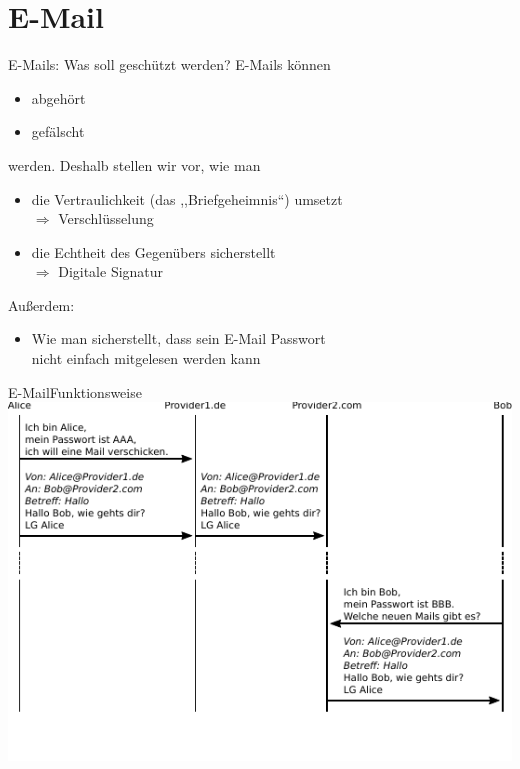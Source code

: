 \section{E-Mail}
\begin{frame}{E-Mails: Was soll geschützt werden?}
  E-Mails können
  \begin{itemize}
    \item abgehört
    \item gefälscht
  \end{itemize}
  werden. Deshalb stellen wir vor, wie man
  \begin{itemize}
    \item die Vertraulichkeit (das ,,Briefgeheimnis``) umsetzt
    \\ $\Rightarrow$ Verschlüsselung
    \item die Echtheit des Gegenübers sicherstellt
    \\ $\Rightarrow$ Digitale Signatur
  \end{itemize}
  Außerdem:
  \begin{itemize}
    \item Wie man sicherstellt, dass sein E-Mail Passwort\\ nicht einfach mitgelesen werden kann
  \end{itemize}
\end{frame}

\begin{frame}{E-Mail}{Funktionsweise}
  \includegraphics[width=.9\textwidth]{images/maildaten.pdf}
  \scriptsize
  ~\\
  ~\\
\end{frame}

